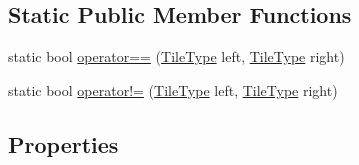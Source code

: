 \subsection*{Static Public Member Functions}
\begin{DoxyCompactItemize}
\item 
static bool \hyperlink{class_tile_type_a626a9795ec9334cd621342faab6fa6e4}{operator==} (\hyperlink{class_tile_type}{Tile\+Type} left, \hyperlink{class_tile_type}{Tile\+Type} right)
\item 
static bool \hyperlink{class_tile_type_a9f34d34dd04b6ff5b6141db70f8e0c48}{operator!=} (\hyperlink{class_tile_type}{Tile\+Type} left, \hyperlink{class_tile_type}{Tile\+Type} right)
\end{DoxyCompactItemize}
\subsection*{Properties}
